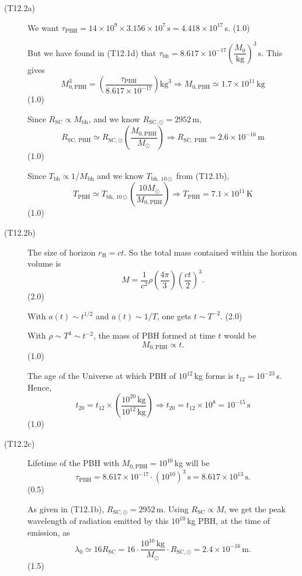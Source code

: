 \begin{description}
\item[(T12.2a)] We want
  $\tau_{\mathrm{PBH}} = 14 \times 10^{9} \times 3.156 \times 10^{7}\,\mathrm{s}
  = 4.418 \times 10^{17}$\,s. \hfill(1.0)

  But we have found in (T12.1d) that
  $\tau_{\mathrm{bh}} = 8.617 \times 10^{-17}
  \left(\dfrac{M_0}{\mathrm{kg}}\right)^3$\,s. This gives
  \[
    M_{0,\mathrm{PBH}}^3
    = \left(\frac{\tau_{\mathrm{PBH}}}{8.617 \times 10^{-17}}\right)
      \mathrm{kg}^3
    \Rightarrow M_{0,\mathrm{PBH}} \simeq 1.7 \times 10^{11}\,\mathrm{kg}
  \]
  \hfill(1.0)

  Since $R_{\mathrm{SC}} \propto M_{\mathrm{bh}}$, and we know
  $R_{\mathrm{SC,\odot}} = 2952$\,m,
  \[
    R_{\mathrm{SC,\,PBH}} \simeq R_{\mathrm{SC,\odot}}
    \left(\frac{M_{0,\mathrm{PBH}}}{M_\odot}\right)
    \Rightarrow R_{\mathrm{SC,\,PBH}} = 2.6 \times 10^{-16}\,\mathrm{m}
  \]
  \hfill(1.0)

  Since $T_{\mathrm{bh}} \propto 1/M_{\mathrm{bh}}$ and we know
  $T_{\mathrm{bh,\,10\odot}}$ from (T12.1b),
  \[
    T_{\mathrm{PBH}} \simeq T_{\mathrm{bh,\,10\odot}}
    \left(\frac{10 M_\odot}{M_{0,\mathrm{PBH}}}\right)
    \Rightarrow T_{\mathrm{PBH}} = 7.1 \times 10^{11}\,\mathrm{K}
  \]
  \hfill(1.0)

\item[(T12.2b)] The size of horizon $r_{\mathrm{H}} = ct$. So the total mass
  contained within the horizon volume is
  \[
    M = \frac{1}{c^2}\rho \left(\frac{4\pi}{3}\right)
      \left(\frac{ct}{2}\right)^3.
  \]
  \hfill(2.0)

  With $a(t) \sim t^{1/2}$ and $a(t) \sim 1/T$, one gets
  $t \sim T^{-2}$. \hfill(2.0)

  With $\rho \sim T^4 \sim t^{-2}$, the mass of PBH formed at time $t$ would
  be
  \[
    M_{0,\mathrm{PBH}} \propto t.
  \]
  \hfill(1.0)

  The age of the Universe at which PBH of $10^{12}$\,kg forms is
  $t_{12} = 10^{-23}$\,s. Hence,
  \[
    t_{20} = t_{12} \times
    \left(\frac{10^{20}\,\mathrm{kg}}{10^{12}\,\mathrm{kg}}\right)
    \Rightarrow t_{20} = t_{12} \times 10^{8} = 10^{-15}\,\mathrm{s}
  \]
  \hfill(1.0)

\item[(T12.2c)] Lifetime of the PBH with
  $M_{0,\mathrm{PBH}} = 10^{10}$\,kg will be
  \[
    \tau_{\mathrm{PBH}} = 8.617 \times 10^{-17} \cdot (10^{10})^3\,\mathrm{s}
    = 8.617 \times 10^{13}\,\mathrm{s}.
  \]
  \hfill(0.5)

  As given in (T12.1b), $R_{\mathrm{SC,\odot}} = 2952$\,m. Using
  $R_{\mathrm{SC}} \propto M$, we get the peak wavelength of radiation
  emitted by this $10^{10}$\,kg PBH, at the time of emission, as
  \[
    \lambda_0 \simeq 16 R_{\mathrm{SC}}
    = 16 \cdot \frac{10^{10}\,\mathrm{kg}}{M_\odot} \cdot
      R_{\mathrm{SC,\odot}}
    = 2.4 \times 10^{-16}\,\mathrm{m}.
  \]
  \hfill(1.5)


\end{description}
